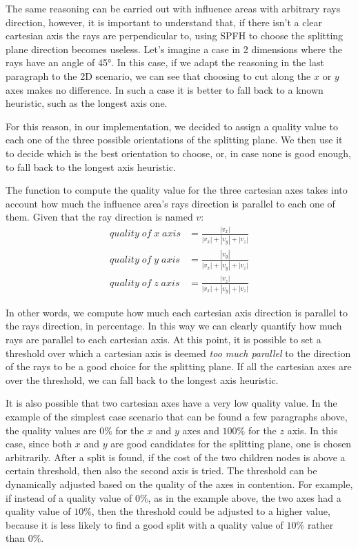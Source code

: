 \documentclass{PoliMi_MasterThesis}
\begin{document}
The same reasoning can be carried out with influence areas with arbitrary rays direction, however, it is important to understand that, if there isn't a clear cartesian axis the rays are perpendicular to, using SPFH to choose the splitting plane direction becomes useless. Let's imagine a case in 2 dimensions where the rays have an angle of 45°. In this case, if we adapt the reasoning in the last paragraph to the 2D scenario, we can see that choosing to cut along the $x$ or $y$ axes makes no difference. In such a case it is better to fall back to a known heuristic, such as the longest axis one.

For this reason, in our implementation, we decided to assign a quality value to each one of the three possible orientations of the splitting plane. We then use it to decide which is the best orientation to choose, or, in case none is good enough, to fall back to the longest axis heuristic.

The function to compute the quality value for the three cartesian axes takes into account how much the influence area's rays direction is parallel to each one of them. Given that the ray direction is named $v$:
\begin{align*}
	quality\;of\;x\;axis &= \frac{|v_x|}{|v_x|+|v_y|+|v_z|} \\
	quality\;of\;y\;axis &= \frac{|v_y|}{|v_x|+|v_y|+|v_z|} \\
	quality\;of\;z\;axis &= \frac{|v_z|}{|v_x|+|v_y|+|v_z|}
\end{align*}

In other words, we compute how much each cartesian axis direction is parallel to the rays direction, in percentage. In this way we can clearly quantify how much rays are parallel to each cartesian axis. At this point, it is possible to set a threshold over which a cartesian axis is deemed \textit{too much parallel} to the direction of the rays to be a good choice for the splitting plane. If all the cartesian axes are over the threshold, we can fall back to the longest axis heuristic.

It is also possible that two cartesian axes have a very low quality value. In the example of the simplest case scenario that can be found a few paragraphs above, the quality values are $0\%$ for the $x$ and $y$ axes and $100\%$ for the $z$ axis. In this case, since both $x$ and $y$ are good candidates for the splitting plane, one is chosen arbitrarily. After a split is found, if the cost of the two children nodes is above a certain threshold, then also the second axis is tried. The threshold can be dynamically adjusted based on the quality of the axes in contention. For example, if instead of a quality value of $0\%$, as in the example above, the two axes had a quality value of $10\%$, then the threshold could be adjusted to a higher value, because it is less likely to find a good split with a quality value of $10\%$ rather than $0\%$.
\end{document}
